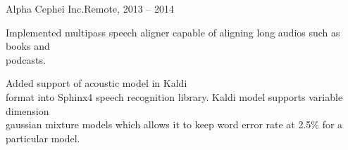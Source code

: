 \documentclass[11pt,a4paper]{article}
\begin{document}
\begin{multicols}{2}
  \begin{project1}{Alpha Cephei Inc.}{Remote, 2013 -- 2014}
    \begin{items}
      \item Implemented multipass speech aligner capable of aligning long
        audios such as books and\\podcasts.
      \item Added support of acoustic model in Kaldi\\format into Sphinx4
        speech recognition library. Kaldi model supports variable
        dimension\\gaussian mixture models which allows it to keep word error
        rate at 2.5$\%$ for a particular model.
    \end{items}
  \end{project1}

\end{multicols}
\end{document}
